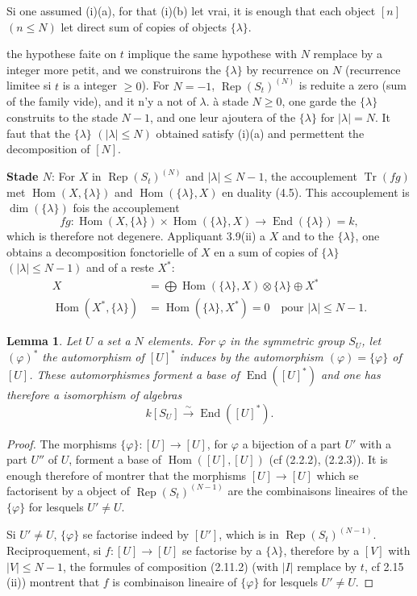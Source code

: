 \documentclass[11pt,a4paper]{article}
\theoremstyle{plain}
\newtheorem{lemma}[theorem]{Lemma}
\theoremstyle{definition}
\DeclareMathOperator{\Hom}{Hom}
\DeclareMathOperator{\End}{End}
\DeclareMathOperator{\Tr}{Tr}
\DeclareMathOperator{\Rep}{Rep}
\newcommand{\isom}{\xrightarrow{\sim}}
\begin{document}
Si one assumed (i)(a), for that (i)(b) let vrai, it is enough that each object $[n]$ $(n \leq N)$ let direct sum of copies of objects $\{\lambda\}$.

the hypothese faite on $t$ implique the same hypothese with $N$ remplace by a integer more petit, and we construirons the $\{\lambda\}$ by recurrence on $N$ (recurrence limitee si $t$ is a integer $\geq 0$). For $N = -1$, $\Rep(S_t)^{(N)}$ is reduite a zero (sum of the family vide), and it n'y a not of $\lambda$. \`a stade $N \geq 0$, one garde the $\{\lambda\}$ construits to the stade $N-1$, and one leur ajoutera of the $\{\lambda\}$ for $|\lambda| = N$. It faut that the $\{\lambda\}$ $(|\lambda| \leq N)$ obtained satisfy (i)(a) and permettent the decomposition of $[N]$.

\textbf{Stade $N$}: For $X$ in $\Rep(S_t)^{(N)}$ and $|\lambda| \leq N-1$, the accouplement $\Tr(fg)$ met $\Hom(X, \{\lambda\})$ and $\Hom(\{\lambda\}, X)$ en duality (4.5). This accouplement is $\dim(\{\lambda\})$ fois the accouplement
\begin{equation}
fg : \Hom(X, \{\lambda\}) \times \Hom(\{\lambda\}, X) \to \End(\{\lambda\}) = k, \tag{5.1.1}
\end{equation}
which is therefore not degenere. Appliquant 3.9(ii) a $X$ and to the $\{\lambda\}$, one obtains a decomposition fonctorielle of $X$ en a sum of copies of $\{\lambda\}$ $(|\lambda| \leq N-1)$ and of a reste $X^*$:
\begin{align}
X &= \bigoplus \Hom(\{\lambda\}, X) \otimes \{\lambda\} \oplus X^* \tag{5.1.2} \\
\Hom(X^*, \{\lambda\}) &= \Hom(\{\lambda\}, X^*) = 0 \quad \text{pour } |\lambda| \leq N-1. \tag{5.1.3}
\end{align}

\begin{lemma}
Let $U$ a set a $N$ elements. For $\varphi$ in the symmetric group $S_U$, let $(\varphi)^*$ the automorphism of $[U]^*$ induces by the automorphism $(\varphi) = \{\varphi\}$ of $[U]$. These automorphismes forment a base of $\End([U]^*)$ and one has therefore a isomorphism of algebras
\begin{equation}
k[S_U] \isom \End([U]^*). \tag{5.2.1}
\end{equation}
\end{lemma}

\begin{proof}
The morphisms $\{\varphi\} : [U] \to [U]$, for $\varphi$ a bijection of a part $U'$ with a part $U''$ of $U$, forment a base of $\Hom([U], [U])$ (cf (2.2.2), (2.2.3)). It is enough therefore of montrer that the morphisms $[U] \to [U]$ which se factorisent by a object of $\Rep(S_t)^{(N-1)}$ are the combinaisons lineaires of the $\{\varphi\}$ for lesquels $U' \neq U$.

Si $U' \neq U$, $\{\varphi\}$ se factorise indeed by $[U']$, which is in $\Rep(S_t)^{(N-1)}$. Reciproquement, si $f : [U] \to [U]$ se factorise by a $\{\lambda\}$, therefore by a $[V]$ with $|V| \leq N-1$, the formules of composition (2.11.2) (with $|I|$ remplace by $t$, cf 2.15 (ii)) montrent that $f$ is combinaison lineaire of $\{\varphi\}$ for lesquels $U' \neq U$.
\end{proof}
\end{document}
